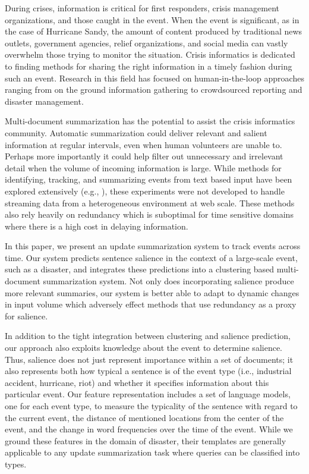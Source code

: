 \label{sec:introduction}
During crises, information is critical for first responders,
 crisis management organizations, and those caught in the event.  
When the event is significant, as in the case of Hurricane
Sandy, the amount of content produced by traditional news outlets,
government agencies, relief organizations, and social media can vastly
overwhelm those trying to monitor the situation. 
Crisis informatics \cite{?} is dedicated to finding methods for sharing the
right information in a timely fashion during such an event.
Research in this field has focused on
human-in-the-loop approaches ranging from on the ground information 
gathering to crowdsourced reporting and disaster management.

Multi-document summarization has the potential to assist the crisis 
informatics community. 
Automatic summarization could deliver
relevant and salient information at regular intervals, 
even when human volunteers are unable to. 
Perhaps more importantly it could help filter out
unnecessary and irrelevant detail when the volume of incoming information
is large. 
While methods for identifying,
tracking, and summarizing events from text based input have been explored
extensively
(e.g.,
\cite{allan1998topic,Filatova&Hatzivassiloglou.04a,Wang&al.11}), 
these experiments were not developed to handle streaming data from a
 heterogeneous environment at web scale. 
These methods also rely heavily on redundancy which is suboptimal for time
sensitive domains where there is a high cost in delaying information.

In this paper, we present an update summarization system to track events
across time. Our system predicts sentence salience in the context of a
large-scale event, such as a disaster, and integrates these predictions into
a clustering based multi-document summarization system. 
Not only does incorporating salience produce more relevant summaries,
our system is better able to adapt to
dynamic changes in input volume which adversely 
effect methods that use redundancy as a proxy for salience. 


In addition to the tight integration between clustering and salience
prediction, our approach also exploits knowledge about the event to determine
salience. Thus, salience does not just represent importance within a set of
documents; it also represents both how typical a sentence is of the  
event
type (i.e., industrial accident, hurricane, riot) and whether it specifies 
information
about this particular event. 
Our feature representation includes a set of language models, one for each
event type, to measure the typicality of the sentence with regard to the 
current event, the distance of mentioned locations from the center of
the event, and the change in word frequencies over the time of the event.
While we ground these features in the domain of disaster, their templates
are generally applicable to any update summarization task where queries can be classified into types.

